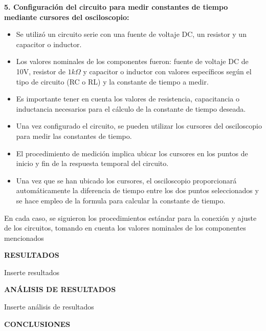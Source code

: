 \documentclass[12pt]{article}
\begin{document}
	\textbf{5. Configuración del circuito para medir constantes de tiempo mediante cursores del osciloscopio:}
	
	\begin{itemize}
		\item Se utilizó un circuito serie con una fuente de voltaje DC, un resistor y un capacitor o inductor.
		\item Los valores nominales de los componentes fueron: fuente de voltaje DC de 10V, resistor de $1k\Omega$ y capacitor o inductor con valores específicos según el tipo de circuito (RC o RL) y la constante de tiempo a medir.
		\item Es importante tener en cuenta los valores de resistencia, capacitancia o inductancia necesarios para el cálculo de la constante de tiempo deseada.
		\item Una vez configurado el circuito, se pueden utilizar los cursores del osciloscopio para medir las constantes de tiempo.
		\item El procedimiento de medición implica ubicar los cursores en los puntos de inicio y fin de la respuesta temporal del circuito.	
		\item Una vez que se han ubicado los cursores, el osciloscopio proporcionará automáticamente la diferencia de tiempo entre los dos puntos seleccionados y se hace empleo de la formula para calcular la constante de tiempo.	
		 		
	\end{itemize}
	
	En cada caso, se siguieron los procedimientos estándar para la conexión y ajuste de los circuitos, tomando en cuenta los valores nominales de los componentes mencionados
	
	\newpage
	
	\begin{center}
		\textbf{\large RESULTADOS}\\
	\end{center}
	
	Inserte resultados
	
	\newpage
	
	\begin{center}
		\textbf{\large ANÁLISIS DE RESULTADOS}\\
	\end{center}
	
	Inserte análisis de resultados
	
	\newpage
	
	\begin{center}
		\textbf{\large CONCLUSIONES}\\
	\end{center}
	
\end{document}
